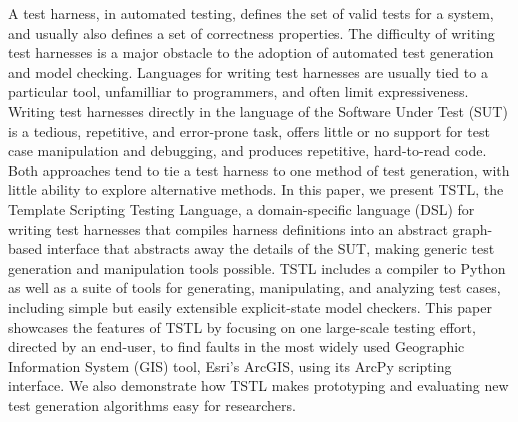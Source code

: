 A test harness, in automated testing, defines the set of valid tests
for a system, and usually also defines a set of correctness
properties.  The difficulty of writing test harnesses is a major
obstacle to the adoption of automated test generation and model
checking.  Languages for writing test harnesses are usually tied to a
particular tool, unfamilliar to programmers, and often limit
expressiveness.  Writing test harnesses directly in the language of
the Software Under Test (SUT) is a tedious, repetitive, and
error-prone task, offers little or no support for test case
manipulation and debugging, and produces repetitive, hard-to-read
code.  Both approaches tend to tie a test harness to one method of
test generation, with little ability to explore alternative methods.
In this paper, we present TSTL, the Template Scripting Testing
Language, a domain-specific language (DSL) for writing test harnesses
that compiles harness definitions into an abstract graph-based
interface that abstracts away the details of the SUT, making generic
test generation and manipulation tools possible.  TSTL includes a
compiler to Python as well as a suite of tools for generating, manipulating,
and analyzing test cases, including simple but easily extensible explicit-state model
checkers.  This paper showcases the features of TSTL by focusing on
one large-scale testing effort, directed by an end-user, to find
faults in the most widely used Geographic Information System (GIS) tool,
Esri's ArcGIS, using its ArcPy scripting interface.  We also
demonstrate how TSTL makes prototyping and evaluating new test
generation algorithms easy for researchers.


